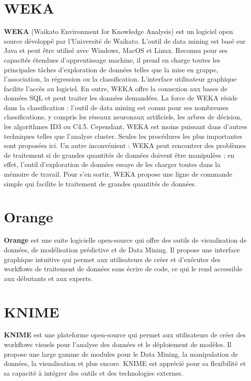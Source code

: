 \documentclass[a4paper,12pt]{report}
\begin{document}
    \section{WEKA}
    \textbf{WEKA} (Waikato Environment for Knowledge Analysis) est un logiciel open source développé par l'Université de Waikato. L'outil de data mining est basé sur Java et peut être utilisé avec Windows, MacOS et Linux. Reconnu pour ses capacités étendues d'apprentissage machine, il prend en charge toutes les principales tâches d'exploration de données telles que la mise en grappe, l'association, la régression ou la classification. L'interface utilisateur graphique facilite l'accès au logiciel. En outre, WEKA offre la connexion aux bases de données SQL et peut traiter les données demandées. La force de WEKA réside dans la classification : l'outil de data mining est connu pour ses nombreuses classifications, y compris les réseaux neuronaux artificiels, les arbres de décision, les algorithmes ID3 ou C4.5. Cependant, WEKA est moins puissant dans d'autres techniques telles que l'analyse cluster. Seules les procédures les plus importantes sont proposées ici. Un autre inconvénient : WEKA peut rencontrer des problèmes de traitement si de grandes quantités de données doivent être manipulées ; en effet, l'outil d'exploration de données essaye de les charger toutes dans la mémoire de travail. Pour s'en sortir, WEKA propose une ligne de commande simple qui facilite le traitement de grandes quantités de données. 

    
    \section{Orange}
    \textbf{Orange} est une suite logicielle open-source qui offre des outils de visualisation de données, de modélisation prédictive et de Data Mining. Il propose une interface graphique intuitive qui permet aux utilisateurs de créer et d’exécuter des workflows de traitement de données sans écrire de code, ce qui le rend accessible aux débutants et aux experts.

    
    \section{KNIME}
    \textbf{KNIME} est une plateforme open-source qui permet aux utilisateurs de créer des workflows visuels pour l’analyse des données et le déploiement de modèles. Il propose une large gamme de modules pour le Data Mining, la manipulation de données, la visualisation et plus encore. KNIME est apprécié pour sa flexibilité et sa capacité à intégrer des outils et des technologies externes.
    
\end{document}
